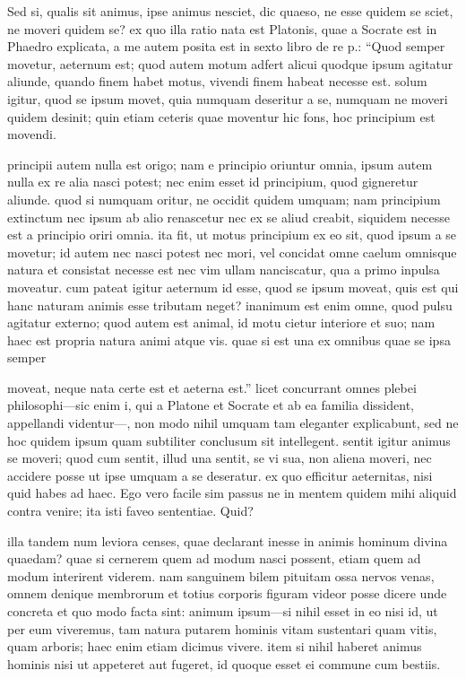  Sed si, qualis sit animus, ipse animus nesciet, dic quaeso, ne esse quidem se sciet, ne moveri quidem se? ex quo illa ratio nata est Platonis, quae a Socrate est in Phaedro explicata, a me autem posita est in sexto libro de re p.: ``Quod semper movetur, aeternum est; quod autem motum adfert alicui quodque ipsum agitatur aliunde, quando finem habet motus, vivendi finem habeat necesse est. solum igitur, quod se ipsum movet, quia numquam deseritur a se, numquam ne moveri quidem desinit; quin etiam ceteris quae moventur hic fons, hoc principium est movendi.

 principii autem nulla est origo; nam e principio oriuntur omnia, ipsum autem nulla ex re alia nasci potest; nec enim esset id principium, quod gigneretur aliunde. quod si numquam oritur, ne occidit quidem umquam; nam principium extinctum nec ipsum ab alio renascetur nec ex se aliud creabit, siquidem necesse est a principio oriri omnia. ita fit, ut motus principium ex eo sit, quod ipsum a se movetur; id autem nec nasci potest nec mori, vel concidat omne caelum omnisque natura et consistat necesse est nec vim ullam nanciscatur, qua a primo inpulsa moveatur. cum pateat igitur aeternum id esse, quod se ipsum moveat, quis est qui hanc naturam animis esse tributam neget? inanimum est enim omne, quod pulsu agitatur externo; quod autem est animal, id motu cietur interiore et suo; nam haec est propria natura animi atque vis. quae si est una ex omnibus quae se ipsa semper

 moveat, neque nata certe est et aeterna est.'' licet concurrant omnes plebei philosophi—sic enim i, qui a Platone et Socrate et ab ea familia dissident, appellandi videntur—, non modo nihil umquam tam eleganter explicabunt, sed ne hoc quidem ipsum quam subtiliter conclusum sit intellegent. sentit igitur animus se moveri; quod cum sentit, illud una sentit, se vi sua, non aliena moveri, nec accidere posse ut ipse umquam a se deseratur. ex quo efficitur aeternitas, nisi quid habes ad haec. Ego vero facile sim passus ne in mentem quidem mihi aliquid contra venire; ita isti faveo sententiae. Quid?

 illa tandem num leviora censes, quae declarant inesse in animis hominum divina quaedam? quae si cernerem quem ad modum nasci possent, etiam quem ad modum interirent viderem. nam sanguinem bilem pituitam ossa nervos venas, omnem denique membrorum et totius corporis figuram videor posse dicere unde concreta et quo modo facta sint: animum ipsum—si nihil esset in eo nisi id, ut per eum viveremus, tam natura putarem hominis vitam sustentari quam vitis, quam arboris; haec enim etiam dicimus vivere. item si nihil haberet animus hominis nisi ut appeteret aut fugeret, id quoque esset ei commune cum bestiis.


